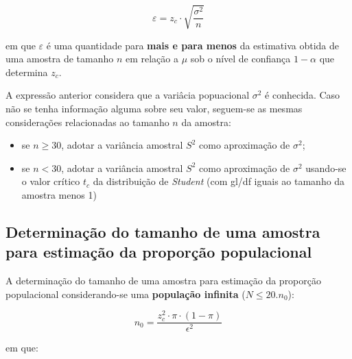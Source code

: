 \documentclass[
]{book}
\providecommand{\tightlist}{%
  \setlength{\itemsep}{0pt}\setlength{\parskip}{0pt}}
\begin{document}
\hfill\break

\[
\varepsilon =  z_{c}\cdot \sqrt{\frac{\sigma^{2}}{n}}
\]

\hfill\break

em que \(\varepsilon\) é uma quantidade para \textbf{mais e para menos} da estimativa obtida de uma amostra de tamanho \(n\) em relação a \(\mu\) sob o nível de confiança \(1-\alpha\) que determina \(z_{c}\).

\hfill\break

A expressão anterior considera que a variâcia popuacional \(\sigma^{2}\) é conhecida. Caso não se tenha informação alguma sobre seu valor, seguem-se as mesmas considerações relacionadas ao tamanho \(n\) da amostra:

\hfill\break

\begin{itemize}
\tightlist
\item
  se \(n \ge 30\), adotar a variância amostral \(S^{2}\) como aproximação de \(\sigma^{2}\);\\
\item
  se \(n < 30\), adotar a variância amostral \(S^{2}\) como aproximação de \(\sigma^{2}\) usando-se o valor crítico \(t_{c}\) da distribuição de \emph{Student} (com gl/df iguais ao tamanho da amostra menos 1)
\end{itemize}

\hfill\break

\hypertarget{determinauxe7uxe3o-do-tamanho-de-uma-amostra-para-estimauxe7uxe3o-da-proporuxe7uxe3o-populacional}{%
\subsection{Determinação do tamanho de uma amostra para estimação da proporção populacional}\label{determinauxe7uxe3o-do-tamanho-de-uma-amostra-para-estimauxe7uxe3o-da-proporuxe7uxe3o-populacional}}

\hfill\break

A determinação do tamanho de uma amostra para estimação da proporção populacional considerando-se uma \textbf{população infinita} (\(N \le 20. n_{0}\)):

\hfill\break

\[
n_{0} = \frac{z_{c}^{2} \cdot \pi \cdot (1- \pi) }{\epsilon^{2}}
\]

\hfill\break

em que:

\hfill\break
\end{document}
